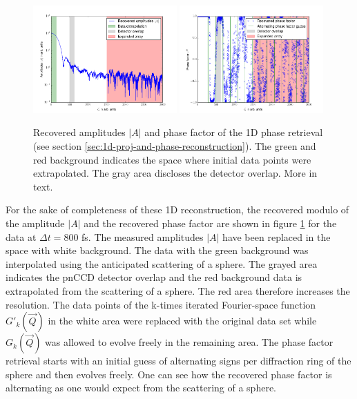 \begin{figure}
	\centering
		\includegraphics[width=0.49\textwidth]{images/results/amplitude-discussion.png}
		\includegraphics[width=0.49\textwidth]{images/results/phase-discussion.png}
	\caption[Recovered Amplitudes $\left|A\right|$ and phase factor of 1D reconstruction]{Recovered amplitudes $\left|A\right|$ and phase factor of the 1D phase retrieval (see section \ref{sec:1d-proj-and-phase-reconstruction}). The green and red background indicates the space where initial data points were extrapolated. The gray area discloses the detector overlap. More in text.}
	\label{fig:amplitude-phase}
\end{figure}
For the sake of completeness of these 1D reconstruction, the recovered modulo of the amplitude $\left|A\right|$ and the recovered phase factor are shown in figure \ref{fig:amplitude-phase} for the data at $\Delta t =800$ fs. The measured amplitudes $\left|A\right|$ have been replaced in the space with white background. The data with the green background was interpolated using the anticipated scattering of a sphere. The grayed area indicates the pnCCD detector overlap and the red background data is extrapolated from the scattering of a sphere. The red area therefore increases the resolution. The data points of the k-times iterated Fourier-space function $G'_{k}(\vec{Q})$ in the white area were replaced with the original data set while $G_{k}(\vec{Q})$ was allowed to evolve freely in the remaining area. The phase factor retrieval starts with an initial guess of alternating signs per diffraction ring of the sphere and then evolves freely. One can see how the recovered phase factor is alternating as one would expect from the scattering of a sphere.\\
